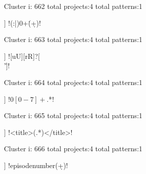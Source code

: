 Cluster i: 662
total projects:4
total patterns:1
\begin{multicols}{1}
\begin{description}[noitemsep,topsep=0pt]
\item [[4] ] \cverb!(:|\s)0+\.(\d+)!
\end{description}
\end{multicols}







Cluster i: 663
total projects:4
total patterns:1
\begin{multicols}{1}
\begin{description}[noitemsep,topsep=0pt]
\item [[4] ] \cverb![uU][rR]?[\\'\"]!
\end{description}
\end{multicols}







Cluster i: 664
total projects:4
total patterns:1
\begin{multicols}{1}
\begin{description}[noitemsep,topsep=0pt]
\item [[4] ] \cverb!\s*\(0[0-7]+\).*!
\end{description}
\end{multicols}







Cluster i: 665
total projects:4
total patterns:1
\begin{multicols}{1}
\begin{description}[noitemsep,topsep=0pt]
\item [[4] ] \cverb!<title>(.*)</title>!
\end{description}
\end{multicols}







Cluster i: 666
total projects:4
total patterns:1
\begin{multicols}{1}
\begin{description}[noitemsep,topsep=0pt]
\item [[4] ] \cverb!episodenumber(\d+)!
\end{description}
\end{multicols}







